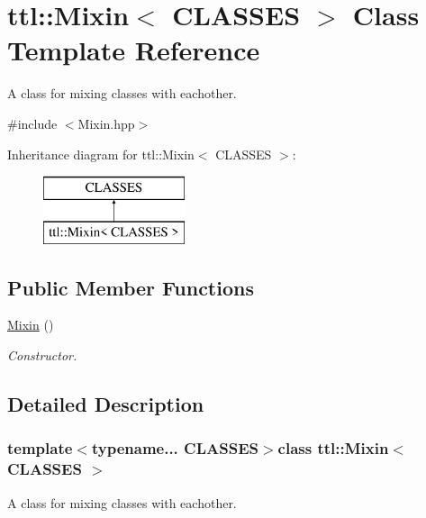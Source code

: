 \hypertarget{classttl_1_1_mixin}{\section{ttl\-:\-:Mixin$<$ C\-L\-A\-S\-S\-E\-S $>$ Class Template Reference}
\label{classttl_1_1_mixin}
}


A class for mixing classes with eachother.  




{\ttfamily \#include $<$Mixin.\-hpp$>$}

Inheritance diagram for ttl\-:\-:Mixin$<$ C\-L\-A\-S\-S\-E\-S $>$\-:\begin{figure}[H]
\begin{center}
\leavevmode
\includegraphics[height=2.000000cm]{classttl_1_1_mixin}
\end{center}
\end{figure}
\subsection*{Public Member Functions}
\begin{DoxyCompactItemize}
\item 
\hyperlink{classttl_1_1_mixin_a7b9697018f0edc09abc9bc3d6a4e2010}{Mixin} ()
\begin{DoxyCompactList}\small\item\em Constructor. \end{DoxyCompactList}\end{DoxyCompactItemize}


\subsection{Detailed Description}
\subsubsection*{template$<$typename... C\-L\-A\-S\-S\-E\-S$>$class ttl\-::\-Mixin$<$ C\-L\-A\-S\-S\-E\-S $>$}

A class for mixing classes with eachother. 

